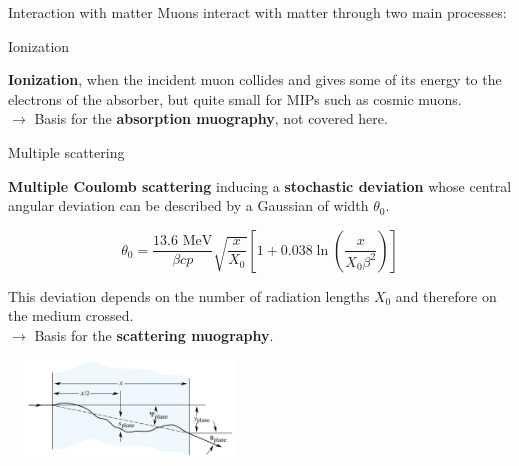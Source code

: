 \documentclass[8 pt]{beamer}
\begin{document}
\begin{frame}{Interaction with matter}
\justifying
Muons interact with matter through two main processes:
\begin{exampleblock}{} Ionization \end{exampleblock}
\textbf{Ionization}, when  the  incident  muon collides and gives some of its energy to the electrons of the absorber, but quite small for MIPs such as cosmic muons. \\
\hspace{10pt} $\rightarrow$ Basis for the \textbf{\alert{absorption muography}}, not covered here. \vfill

\begin{exampleblock}{} Multiple scattering \end{exampleblock}
\textbf{Multiple Coulomb scattering} inducing a \alert{\textbf{stochastic deviation}} whose central angular deviation can be described by a Gaussian of width $\theta_0$.

\begin{minipage}[c]{.48\textwidth}
\begin{equation*}
\label{eq:Moliere}
\theta_0 = \frac{13.6 \text{ MeV}}{\beta c p} \sqrt{\frac{x}{X_0}} \left [1 + 0.038 \ln \left (\frac{x}{X_0 \beta^2} \right ) \right ]
\end{equation*}

\justifying
This deviation depends on the number of radiation lengths $X_0$ and therefore on the medium crossed. \\
\hspace{10pt} $\rightarrow$ Basis for the \textbf{\alert{scattering muography}}.
\end{minipage} \hfill
\begin{minipage}[c]{.51\textwidth}
	\includegraphics[width=6.3cm, height=2.6cm]{figs/moliere.png}
\end{minipage} \hfill \vfill
\end{frame}
\end{document}
